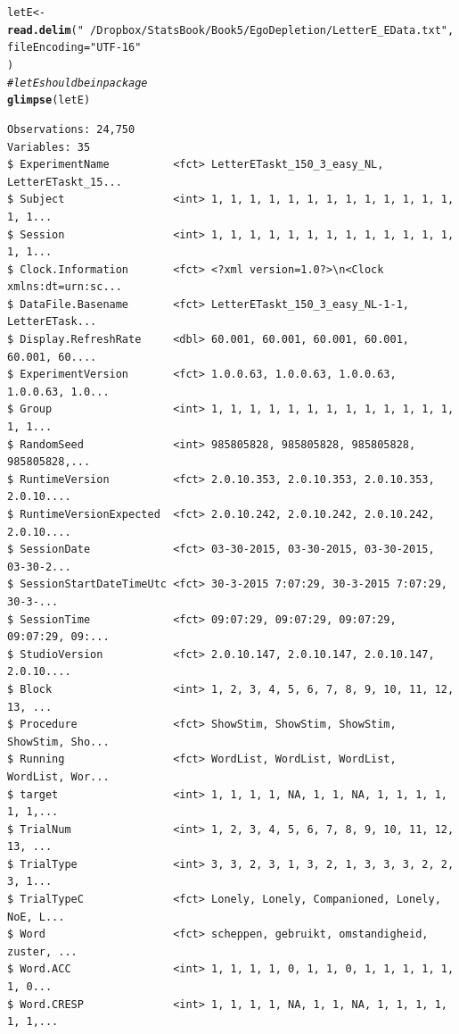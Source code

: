 \documentclass{article}\usepackage[]{graphicx}\usepackage[]{color}
\makeatletter
\newcommand{\hlstr}[1]{\textcolor[rgb]{0.192,0.494,0.8}{#1}}%
\newcommand{\hlcom}[1]{\textcolor[rgb]{0.678,0.584,0.686}{\textit{#1}}}%
\newcommand{\hlstd}[1]{\textcolor[rgb]{0.345,0.345,0.345}{#1}}%
\newcommand{\hlkwb}[1]{\textcolor[rgb]{0.69,0.353,0.396}{#1}}%
\newcommand{\hlkwc}[1]{\textcolor[rgb]{0.333,0.667,0.333}{#1}}%
\newcommand{\hlkwd}[1]{\textcolor[rgb]{0.737,0.353,0.396}{\textbf{#1}}}%
\newenvironment{kframe}{%
 \def\at@end@of@kframe{}%
 \ifinner\ifhmode%
  \def\at@end@of@kframe{\end{minipage}}%
  \begin{minipage}{\columnwidth}%
 \fi\fi%
 \def\FrameCommand##1{\hskip\@totalleftmargin \hskip-\fboxsep
 \colorbox{shadecolor}{##1}\hskip-\fboxsep
     \hskip-\linewidth \hskip-\@totalleftmargin \hskip\columnwidth}%
 \MakeFramed {\advance\hsize-\width
   \@totalleftmargin\z@ \linewidth\hsize
   \@setminipage}}%
 {\par\unskip\endMakeFramed%
 \at@end@of@kframe}
\newenvironment{knitrout}{}{} %
\makeatother
\begin{document}
\begin{knitrout}\footnotesize
{}\color{fgcolor}\begin{kframe}
\begin{alltt}
\hlstd{letE} \hlkwb{<-}
  \hlkwd{read.delim}\hlstd{(}\hlstr{"~/Dropbox/StatsBook/Book5/EgoDepletion/LetterE_EData.txt"}\hlstd{,}
    \hlkwc{fileEncoding} \hlstd{=} \hlstr{"UTF-16"}
  \hlstd{)}
\hlcom{# letE should be in package}
\hlkwd{glimpse}\hlstd{(letE)}
\end{alltt}
\begin{verbatim}
Observations: 24,750
Variables: 35
$ ExperimentName          <fct> LetterETaskt_150_3_easy_NL, LetterETaskt_15...
$ Subject                 <int> 1, 1, 1, 1, 1, 1, 1, 1, 1, 1, 1, 1, 1, 1, 1...
$ Session                 <int> 1, 1, 1, 1, 1, 1, 1, 1, 1, 1, 1, 1, 1, 1, 1...
$ Clock.Information       <fct> <?xml version=1.0?>\n<Clock xmlns:dt=urn:sc...
$ DataFile.Basename       <fct> LetterETaskt_150_3_easy_NL-1-1, LetterETask...
$ Display.RefreshRate     <dbl> 60.001, 60.001, 60.001, 60.001, 60.001, 60....
$ ExperimentVersion       <fct> 1.0.0.63, 1.0.0.63, 1.0.0.63, 1.0.0.63, 1.0...
$ Group                   <int> 1, 1, 1, 1, 1, 1, 1, 1, 1, 1, 1, 1, 1, 1, 1...
$ RandomSeed              <int> 985805828, 985805828, 985805828, 985805828,...
$ RuntimeVersion          <fct> 2.0.10.353, 2.0.10.353, 2.0.10.353, 2.0.10....
$ RuntimeVersionExpected  <fct> 2.0.10.242, 2.0.10.242, 2.0.10.242, 2.0.10....
$ SessionDate             <fct> 03-30-2015, 03-30-2015, 03-30-2015, 03-30-2...
$ SessionStartDateTimeUtc <fct> 30-3-2015 7:07:29, 30-3-2015 7:07:29, 30-3-...
$ SessionTime             <fct> 09:07:29, 09:07:29, 09:07:29, 09:07:29, 09:...
$ StudioVersion           <fct> 2.0.10.147, 2.0.10.147, 2.0.10.147, 2.0.10....
$ Block                   <int> 1, 2, 3, 4, 5, 6, 7, 8, 9, 10, 11, 12, 13, ...
$ Procedure               <fct> ShowStim, ShowStim, ShowStim, ShowStim, Sho...
$ Running                 <fct> WordList, WordList, WordList, WordList, Wor...
$ target                  <int> 1, 1, 1, 1, NA, 1, 1, NA, 1, 1, 1, 1, 1, 1,...
$ TrialNum                <int> 1, 2, 3, 4, 5, 6, 7, 8, 9, 10, 11, 12, 13, ...
$ TrialType               <int> 3, 3, 2, 3, 1, 3, 2, 1, 3, 3, 3, 2, 2, 3, 1...
$ TrialTypeC              <fct> Lonely, Lonely, Companioned, Lonely, NoE, L...
$ Word                    <fct> scheppen, gebruikt, omstandigheid, zuster, ...
$ Word.ACC                <int> 1, 1, 1, 1, 0, 1, 1, 0, 1, 1, 1, 1, 1, 1, 0...
$ Word.CRESP              <int> 1, 1, 1, 1, NA, 1, 1, NA, 1, 1, 1, 1, 1, 1,...

\end{verbatim}
\end{kframe}
\end{knitrout}
\end{document}
